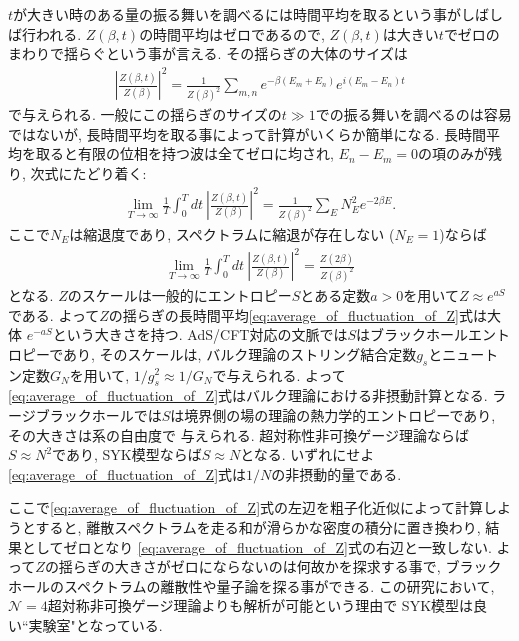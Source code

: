 $t$が大きい時のある量の振る舞いを調べるには時間平均を取るという事がしばしば行われる. 
$Z(\beta, t)$の時間平均はゼロであるので, $Z(\beta, t)$は大きい$t$でゼロのまわりで揺らぐという事が言える. 
その揺らぎの大体のサイズは
\begin{align}
	\left|\frac{Z(\beta, t)}{Z(\beta)}\right|^2
	= \frac{1}{Z(\beta)^2}\sum_{m,n}e^{-\beta(E_m + E_n)}e^{i(E_m - E_n)t}
\end{align}
で与えられる. 
一般にこの揺らぎのサイズの$t \gg 1$での振る舞いを調べるのは容易ではないが, 
長時間平均を取る事によって計算がいくらか簡単になる. 
長時間平均を取ると有限の位相を持つ波は全てゼロに均され, $E_n-E_m = 0$の項のみが残り, 次式にたどり着く:
\begin{align}
	\lim_{T\to\infty}\frac{1}{T}\int_0^Tdt\ \left|\frac{Z(\beta, t)}{Z(\beta)}\right|^2
	= \frac{1}{Z(\beta)^2}\sum_E N_E^2e^{-2\beta E}.
\end{align}
ここで$N_E$は縮退度であり, スペクトラムに縮退が存在しない ($N_E = 1$)ならば
\begin{align}
	\lim_{T\to\infty}\frac{1}{T}\int_0^Tdt\ \left|\frac{Z(\beta, t)}{Z(\beta)}\right|^2
	= \frac{Z(2\beta)}{Z(\beta)^2}
	\label{eq:average_of_fluctuation_of_Z}
\end{align} 
となる. 
$Z$のスケールは一般的にエントロピー$S$とある定数$a > 0$を用いて$Z \approx e^{aS}$である. 
よって$Z$の揺らぎの長時間平均\eqref{eq:average_of_fluctuation_of_Z}式は大体
$e^{-aS}$という大きさを持つ. 
AdS/CFT対応の文脈では$S$はブラックホールエントロピーであり, そのスケールは, 
バルク理論のストリング結合定数$g_s$とニュートン定数$G_N$を用いて, $1/g_s^2 \approx 1/G_N$で与えられる. 
よって\eqref{eq:average_of_fluctuation_of_Z}式はバルク理論における非摂動計算となる. 
ラージブラックホールでは$S$は境界側の場の理論の熱力学的エントロピーであり, その大きさは系の自由度で
与えられる. 
超対称性非可換ゲージ理論ならば$S\approx N^2$であり, SYK模型ならば$S\approx N$となる. 
いずれにせよ\eqref{eq:average_of_fluctuation_of_Z}式は$1/N$の非摂動的量である. 

ここで\eqref{eq:average_of_fluctuation_of_Z}式の左辺を粗子化近似によって計算しようとすると, 
離散スペクトラムを走る和が滑らかな密度の積分に置き換わり, 結果としてゼロとなり
\eqref{eq:average_of_fluctuation_of_Z}式の右辺と一致しない. 
よって$Z$の揺らぎの大きさがゼロにならないのは何故かを探求する事で, 
ブラックホールのスペクトラムの離散性や量子論を探る事ができる. 
この研究において, $\mathcal{N}=4$超対称非可換ゲージ理論よりも解析が可能という理由で
SYK模型は良い``実験室"となっている. 

